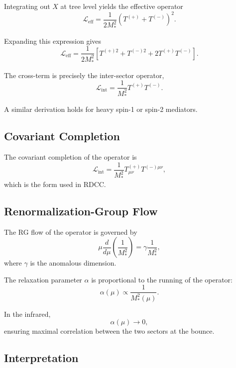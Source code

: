 \documentclass[11pt,a4paper]{article}
\begin{document}
Integrating out $X$ at tree level yields the effective operator
\begin{equation}
\mathcal{L}_{\mathrm{eff}} = 
\frac{1}{2M_*^2} \left( T^{(+)} + T^{(-)} \right)^2.
\end{equation}

Expanding this expression gives
\begin{equation}
\mathcal{L}_{\mathrm{eff}} = 
\frac{1}{2M_*^2} \left[
T^{(+)2} + T^{(-)2} + 2 T^{(+)} T^{(-)}
\right].
\end{equation}

The cross-term is precisely the inter-sector operator,
\begin{equation}
\mathcal{L}_{\mathrm{int}} = \frac{1}{M_*^2} T^{(+)} T^{(-)}.
\end{equation}

A similar derivation holds for heavy spin-1 or spin-2 mediators.

\subsection{Covariant Completion}

The covariant completion of the operator is
\begin{equation}
\mathcal{L}_{\mathrm{int}} = 
\frac{1}{M_*^2} T^{(+)}_{\mu\nu} T^{(-)\mu\nu},
\end{equation}
which is the form used in RDCC.

\subsection{Renormalization-Group Flow}

The RG flow of the operator is governed by
\begin{equation}
\mu \frac{d}{d\mu} \left( \frac{1}{M_*^2} \right)
= \gamma \frac{1}{M_*^2},
\end{equation}
where $\gamma$ is the anomalous dimension.

The relaxation parameter $\alpha$ is proportional to the running of the operator:
\begin{equation}
\alpha(\mu) \propto \frac{1}{M_*^2(\mu)}.
\end{equation}

In the infrared,
\begin{equation}
\alpha(\mu) \to 0,
\end{equation}
ensuring maximal correlation between the two sectors at the bounce.

\subsection{Interpretation}
\end{document}
